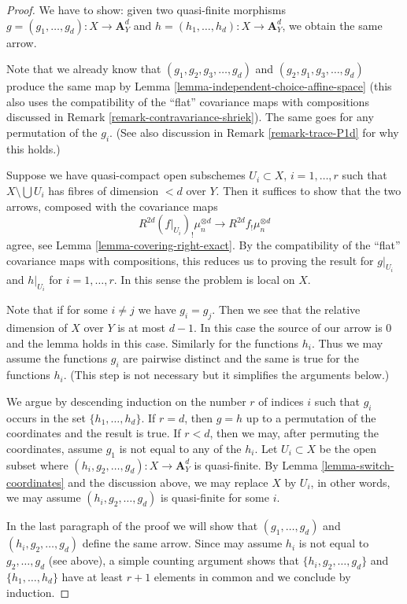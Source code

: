 \begin{proof}
We have to show: given two quasi-finite morphisms
$g = (g_1, \ldots, g_d) : X \to \mathbf{A}^d_Y$ and
$h = (h_1, \ldots, h_d) : X \to \mathbf{A}^d_Y$, we
obtain the same arrow.

\medskip\noindent
Note that we already know that $(g_1, g_2, g_3, \ldots, g_d)$ and
$(g_2, g_1, g_3, \ldots, g_d)$ produce the same map by
Lemma \ref{lemma-independent-choice-affine-space} (this also
uses the compatibility of the ``flat'' covariance maps with compositions
discussed in Remark \ref{remark-contravariance-shriek}).
The same goes for any permutation of the $g_i$. (See also
discussion in Remark \ref{remark-trace-P1d} for why this holds.)

\medskip\noindent
Suppose we have quasi-compact open subschemes $U_i \subset X$,
$i = 1, \ldots, r$ such that $X \setminus \bigcup U_i$ has
fibres of dimension $< d$ over $Y$. Then it suffices to
show that the two arrows, composed with the covariance maps
$$
R^{2d}(f|_{U_i})_!\mu_n^{\otimes d}
\to
R^{2d}f_!\mu_n^{\otimes d}
$$
agree, see Lemma \ref{lemma-covering-right-exact}.
By the compatibility of the ``flat'' covariance maps
with compositions, this reduces us to proving the result
for $g|_{U_i}$ and $h|_{U_i}$ for $i = 1, \ldots, r$.
In this sense the problem is local on $X$.

\medskip\noindent
Note that if for some
$i \not = j$ we have $g_i = g_j$. Then we see that
the relative dimension of $X$ over $Y$ is at most $d - 1$.
In this case the source of our arrow is $0$ and the
lemma holds in this case. Similarly for the functions $h_i$.
Thus we may assume the functions $g_i$ are pairwise distinct
and the same is true for the functions $h_i$.
(This step is not necessary but it simplifies the arguments
below.)

\medskip\noindent
We argue by descending induction on the number $r$
of indices $i$ such that $g_i$ occurs in the set
$\{h_1, \ldots, h_d\}$. If $r = d$, then $g = h$ up to a
permutation of the coordinates and the result is true.
If $r < d$, then we may, after permuting the coordinates,
assume $g_1$ is not equal to any of the $h_i$.
Let $U_i \subset X$ be the open subset where
$(h_i, g_2, \ldots, g_d) : X \to \mathbf{A}^d_Y$ is quasi-finite.
By Lemma \ref{lemma-switch-coordinates} and the discussion above,
we may replace $X$ by $U_i$, in other words, we may assume
$(h_i, g_2, \ldots, g_d)$ is quasi-finite for some $i$.

\medskip\noindent
In the last paragraph of the proof we will show that $(g_1, \ldots, g_d)$ and
$(h_i, g_2, \ldots, g_d)$ define the same arrow.
Since may assume $h_i$ is not equal to $g_2, \ldots, g_d$ (see above),
a simple counting argument shows that $\{h_i, g_2, \ldots, g_d\}$
and $\{h_1, \ldots, h_d\}$ have at least $r + 1$ elements in common
and we conclude by induction.


\end{proof}
